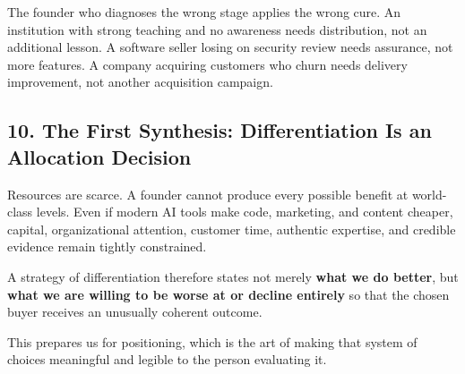 The founder who diagnoses the wrong stage applies the wrong cure. An institution with strong teaching and no awareness needs distribution, not an additional lesson. A software seller losing on security review needs assurance, not more features. A company acquiring customers who churn needs delivery improvement, not another acquisition campaign.

\subsection*{10. The First Synthesis: Differentiation Is an Allocation Decision}

Resources are scarce. A founder cannot produce every possible benefit at world-class levels. Even if modern AI tools make code, marketing, and content cheaper, capital, organizational attention, customer time, authentic expertise, and credible evidence remain tightly constrained.

A strategy of differentiation therefore states not merely \textbf{what we do better}, but \textbf{what we are willing to be worse at or decline entirely} so that the chosen buyer receives an unusually coherent outcome.

This prepares us for positioning, which is the art of making that system of choices meaningful and legible to the person evaluating it.
